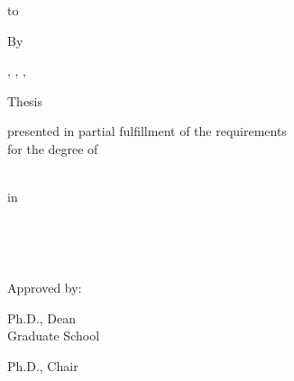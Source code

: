 
\begin{titlepage}
	\vbox to \textheight
	{
		\begin{center}
		{\bfseries \mytitlecaps}
		\vskip 11pt
		
				By \\
		\vskip 11pt
		
		\me
		\vskip 11pt
		
		
		\myprevdegreetwo, \myprevcollegetwo, \myprevlocationtwo, \myprevdegdatetwo
		
		\vskip 11pt
		
		Thesis \\ 
		
		\vskip 11pt
		
		\begin{singlespace}
				presented in partial fulfillment of the requirements \\
				for the degree of
		\end{singlespace}
		
		\vskip 11pt
		
		\begin{singlespace}
		
				\mycurrentdegree \\ 
				in \mymajordept
		
		\end{singlespace}
		
		\vskip 11pt
		
		\begin{singlespace}
		\college \\ 
		\location
		\end{singlespace}
		\mygradsemester \  \mygradyear
		\vskip 11pt
		
		Approved by: \\
		
		\begin{singlespace}
		\gradschooldean{} Ph.D., Dean \\
		Graduate School
		\end{singlespace}
		
		\vskip 11pt
		
		\begin{singlespace}
		\chairname{} Ph.D., Chair \\
		\chairdept
		\end{singlespace}
		

\end{center}}
\end{titlepage}
